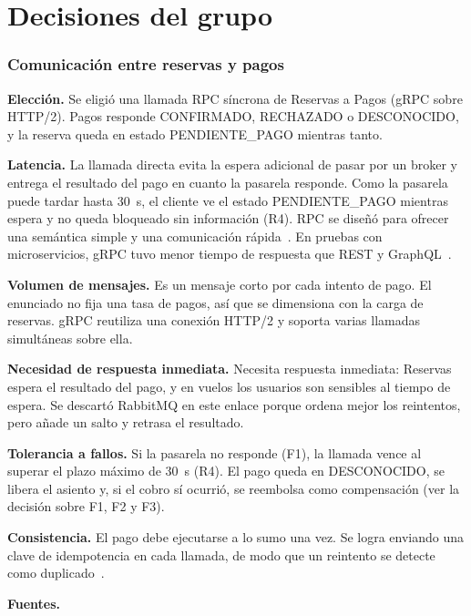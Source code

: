 \documentclass[11pt,a4paper]{article}
\newcommand{\autor}[1]{\par{\small\textit{Redactado por: #1}}\par}
\newcommand{\decision}[8]{\subsubsection*{#1}%
  \textbf{Elección.} #2\par
  \textbf{Latencia.} #3\par
  \textbf{Volumen de mensajes.} #4\par
  \textbf{Necesidad de respuesta inmediata.} #5\par
  \textbf{Tolerancia a fallos.} #6\par
  \textbf{Consistencia.} #7\par
  \textbf{Fuentes.} #8\par}
\begin{document}
\section{Decisiones del grupo}\label{sec:decisiones-grupo}
 \decision{Comunicación entre reservas y pagos}
 {Se eligió una llamada RPC síncrona de Reservas a Pagos (gRPC sobre HTTP/2). Pagos responde CONFIRMADO, RECHAZADO o DESCONOCIDO, y la reserva queda en estado PENDIENTE\_PAGO mientras tanto.}
 {La llamada directa evita la espera adicional de pasar por un broker y entrega el resultado del pago en cuanto la pasarela responde. Como la pasarela puede tardar hasta 30~s, el cliente ve el estado PENDIENTE\_PAGO mientras espera y no queda bloqueado sin información (R4). RPC se diseñó para ofrecer una semántica simple y una comunicación rápida~\cite{birrell1984rpc}. En pruebas con microservicios, gRPC tuvo menor tiempo de respuesta que REST y GraphQL~\cite{niswar2024grpc}.}
 {Es un mensaje corto por cada intento de pago. El enunciado no fija una tasa de pagos, así que se dimensiona con la carga de reservas. gRPC reutiliza una conexión HTTP/2 y soporta varias llamadas simultáneas sobre ella.}
 {Necesita respuesta inmediata: Reservas espera el resultado del pago, y en vuelos los usuarios son sensibles al tiempo de espera. Se descartó RabbitMQ en este enlace porque ordena mejor los reintentos, pero añade un salto y retrasa el resultado.}
 {Si la pasarela no responde (F1), la llamada vence al superar el plazo máximo de 30~s (R4). El pago queda en DESCONOCIDO, se libera el asiento y, si el cobro sí ocurrió, se reembolsa como compensación (ver la decisión sobre F1, F2 y F3).}
 {El pago debe ejecutarse a lo sumo una vez. Se logra enviando una clave de idempotencia en cada llamada, de modo que un reintento se detecte como duplicado~\cite{liskov1991atmostonce}.}
 {\cite{birrell1984rpc,niswar2024grpc,liskov1991atmostonce}}
 
\end{document}
